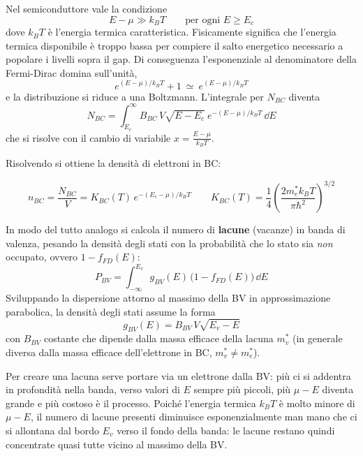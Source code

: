 Nel semiconduttore vale la condizione
\begin{equation}
    E - \mu \gg k_B T \qquad \text{per ogni } E \ge E_c
\end{equation}
dove \( k_B T \) è l'energia termica caratteristica. Fisicamente significa che l'energia termica disponibile è troppo bassa per compiere il salto energetico necessario a popolare i livelli sopra il gap. Di conseguenza l'esponenziale al denominatore della Fermi-Dirac domina sull'unità,
\begin{equation}
    e^{(E - \mu)/k_B T} + 1 \ \simeq \ e^{(E - \mu)/k_B T}
\end{equation}
e la distribuzione si riduce a una Boltzmann. L'integrale per \( N_{BC} \) diventa
\begin{equation}
    N_{BC} = \int_{E_c}^{\infty} B_{BC} \, V \sqrt{E - E_c} \ e^{-(E - \mu)/k_B T} \, \dd E
\end{equation}
che si risolve con il cambio di variabile \(x = \frac{E - \mu}{k_B T}\).

Risolvendo si ottiene la densità di elettroni in BC:
\begin{importantbox}
    \begin{equation}
        n_{BC} = \frac{N_{BC}}{V} = K_{BC}(T) \, e^{-(E_c - \mu)/k_B T}
        \qquad
        K_{BC}(T) = \frac{1}{4} \left( \frac{2 m_e^* k_B T}{\pi \hbar^2} \right)^{3/2}
    \end{equation}
\end{importantbox}

In modo del tutto analogo si calcola il numero di \textbf{lacune} (vacanze) in banda di valenza, pesando la densità degli stati con la probabilità che lo stato sia \emph{non} occupato, ovvero \( 1 - f_{FD}(E) \):
\begin{equation}
    P_{BV} = \int_{-\infty}^{E_v} g_{BV}(E) \, \bigl( 1 - f_{FD}(E) \bigr) \, \dd E
\end{equation}
Sviluppando la dispersione attorno al massimo della BV in approssimazione parabolica, la densità degli stati assume la forma
\begin{equation}
    g_{BV}(E) = B_{BV} \, V \sqrt{E_v - E}
\end{equation}
con \( B_{BV} \) costante che dipende dalla massa efficace della lacuna \( m_v^* \) (in generale diversa dalla massa efficace dell'elettrone in BC, \( m_v^* \ne m_e^* \)).

Per creare una lacuna serve portare via un elettrone dalla BV: più ci si addentra in profondità nella banda, verso valori di \( E \) sempre più piccoli, più \( \mu - E \) diventa grande e più costoso è il processo. Poiché l'energia termica \( k_B T \) è molto minore di \( \mu - E \), il numero di lacune presenti diminuisce esponenzialmente man mano che ci si allontana dal bordo \( E_v \) verso il fondo della banda: le lacune restano quindi concentrate quasi tutte vicino al massimo della BV.

